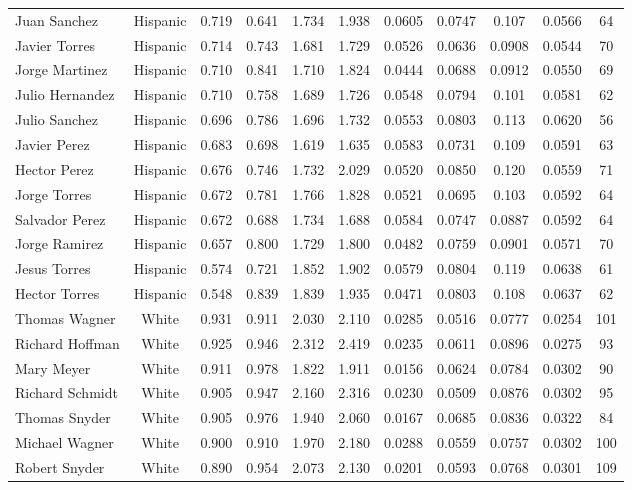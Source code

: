 \documentclass[]{article}
\begin{document}
\begin{tabular}{lcccccccccc}
Juan Sanchez & Hispanic & 0.719 & 0.641 & 1.734 & 1.938 & 0.0605 & 0.0747 & 0.107 & 0.0566 & 64 \\
Javier Torres & Hispanic & 0.714 & 0.743 & 1.681 & 1.729 & 0.0526 & 0.0636 & 0.0908 & 0.0544 & 70 \\
Jorge Martinez & Hispanic & 0.710 & 0.841 & 1.710 & 1.824 & 0.0444 & 0.0688 & 0.0912 & 0.0550 & 69 \\
Julio Hernandez & Hispanic & 0.710 & 0.758 & 1.689 & 1.726 & 0.0548 & 0.0794 & 0.101 & 0.0581 & 62 \\
Julio Sanchez & Hispanic & 0.696 & 0.786 & 1.696 & 1.732 & 0.0553 & 0.0803 & 0.113 & 0.0620 & 56 \\
Javier Perez & Hispanic & 0.683 & 0.698 & 1.619 & 1.635 & 0.0583 & 0.0731 & 0.109 & 0.0591 & 63 \\
Hector Perez & Hispanic & 0.676 & 0.746 & 1.732 & 2.029 & 0.0520 & 0.0850 & 0.120 & 0.0559 & 71 \\
Jorge Torres & Hispanic & 0.672 & 0.781 & 1.766 & 1.828 & 0.0521 & 0.0695 & 0.103 & 0.0592 & 64 \\
Salvador Perez & Hispanic & 0.672 & 0.688 & 1.734 & 1.688 & 0.0584 & 0.0747 & 0.0887 & 0.0592 & 64 \\
Jorge Ramirez & Hispanic & 0.657 & 0.800 & 1.729 & 1.800 & 0.0482 & 0.0759 & 0.0901 & 0.0571 & 70 \\
Jesus Torres & Hispanic & 0.574 & 0.721 & 1.852 & 1.902 & 0.0579 & 0.0804 & 0.119 & 0.0638 & 61 \\
Hector Torres & Hispanic & 0.548 & 0.839 & 1.839 & 1.935 & 0.0471 & 0.0803 & 0.108 & 0.0637 & 62 \\
Thomas Wagner & White & 0.931 & 0.911 & 2.030 & 2.110 & 0.0285 & 0.0516 & 0.0777 & 0.0254 & 101 \\
Richard Hoffman & White & 0.925 & 0.946 & 2.312 & 2.419 & 0.0235 & 0.0611 & 0.0896 & 0.0275 & 93 \\
Mary Meyer & White & 0.911 & 0.978 & 1.822 & 1.911 & 0.0156 & 0.0624 & 0.0784 & 0.0302 & 90 \\
Richard Schmidt & White & 0.905 & 0.947 & 2.160 & 2.316 & 0.0230 & 0.0509 & 0.0876 & 0.0302 & 95 \\
Thomas Snyder & White & 0.905 & 0.976 & 1.940 & 2.060 & 0.0167 & 0.0685 & 0.0836 & 0.0322 & 84 \\
Michael Wagner & White & 0.900 & 0.910 & 1.970 & 2.180 & 0.0288 & 0.0559 & 0.0757 & 0.0302 & 100 \\
Robert Snyder & White & 0.890 & 0.954 & 2.073 & 2.130 & 0.0201 & 0.0593 & 0.0768 & 0.0301 & 109 \\

\end{tabular}
\end{document}
